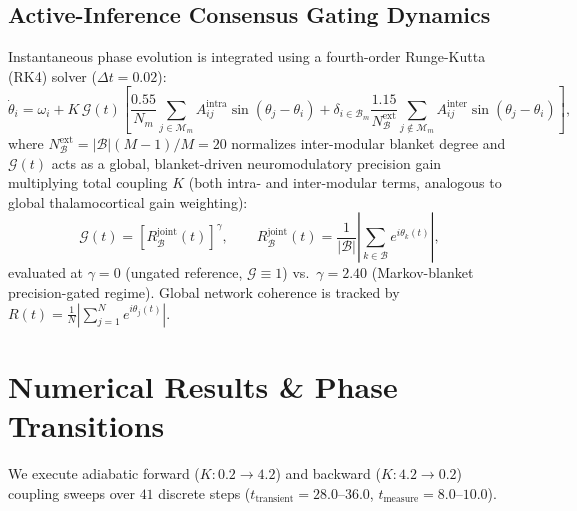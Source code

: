 \documentclass[11pt,a4paper]{article}
\begin{document}
\subsection{Active-Inference Consensus Gating Dynamics}
Instantaneous phase evolution is integrated using a fourth-order Runge-Kutta (RK4) solver ($\Delta t = 0.02$):
\begin{equation}
    \dot{\theta}_i = \omega_i + K\,\mathcal{G}(t)\left[\frac{0.55}{N_m} \sum_{j \in \mathcal{M}_m} A_{ij}^{\text{intra}} \sin(\theta_j - \theta_i) + \delta_{i \in \mathcal{B}_m} \frac{1.15}{N_{\mathcal{B}}^{\mathrm{ext}}} \sum_{j \notin \mathcal{M}_m} A_{ij}^{\text{inter}} \sin(\theta_j - \theta_i)\right],
\end{equation}
where $N_{\mathcal{B}}^{\mathrm{ext}} = |\mathcal{B}|(M-1)/M = 20$ normalizes inter-modular blanket degree and $\mathcal{G}(t)$ acts as a global, blanket-driven neuromodulatory precision gain multiplying total coupling $K$ (both intra- and inter-modular terms, analogous to global thalamocortical gain weighting):
\begin{equation}
    \mathcal{G}(t) = \left[R_{\mathcal{B}}^{\mathrm{joint}}(t)\right]^\gamma, \qquad R_{\mathcal{B}}^{\mathrm{joint}}(t) = \frac{1}{|\mathcal{B}|}\left|\sum_{k \in \mathcal{B}} e^{i\theta_k(t)}\right|,
\end{equation}
evaluated at $\gamma = 0$ (ungated reference, $\mathcal{G} \equiv 1$) vs.\ $\gamma = 2.40$ (Markov-blanket precision-gated regime). Global network coherence is tracked by $R(t) = \frac{1}{N} \left| \sum_{j=1}^N e^{i \theta_j(t)} \right|$.

\section{Numerical Results \& Phase Transitions}

We execute adiabatic forward ($K: 0.2 \to 4.2$) and backward ($K: 4.2 \to 0.2$) coupling sweeps over $41$ discrete steps ($t_{\text{transient}} = 28.0\text{--}36.0$, $t_{\text{measure}} = 8.0\text{--}10.0$).
\end{document}
